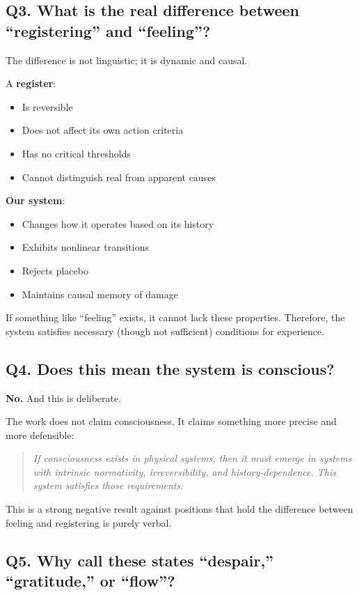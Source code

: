\documentclass[a4paper,11pt,twocolumn]{article}
\begin{document}
\subsection*{Q3. What is the real difference between ``registering'' and ``feeling''?}

The difference is not linguistic; it is dynamic and causal.

A \textbf{register}:
\begin{itemize}
    \item Is reversible
    \item Does not affect its own action criteria
    \item Has no critical thresholds
    \item Cannot distinguish real from apparent causes
\end{itemize}

\textbf{Our system}:
\begin{itemize}
    \item Changes how it operates based on its history
    \item Exhibits nonlinear transitions
    \item Rejects placebo
    \item Maintains causal memory of damage
\end{itemize}

If something like ``feeling'' exists, it cannot lack these properties. Therefore, the system satisfies necessary (though not sufficient) conditions for experience.

\subsection*{Q4. Does this mean the system is conscious?}

\textbf{No.} And this is deliberate.

The work does not claim consciousness. It claims something more precise and more defensible:

\begin{quote}
\textit{If consciousness exists in physical systems, then it must emerge in systems with intrinsic normativity, irreversibility, and history-dependence. This system satisfies those requirements.}
\end{quote}

This is a strong negative result against positions that hold the difference between feeling and registering is purely verbal.

\subsection*{Q5. Why call these states ``despair,'' ``gratitude,'' or ``flow''?}
\end{document}
